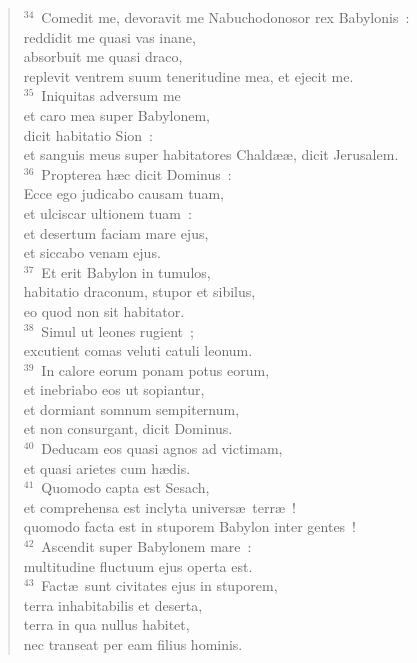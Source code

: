 \begin{flushleft}
\begin{verse}
${}^{34}$~Comedit me, devoravit me Nabuchodonosor rex Babylonis~:\\ reddidit me quasi vas inane,\\ absorbuit me quasi draco,\\ replevit ventrem suum teneritudine mea, et ejecit me.\\
${}^{35}$~Iniquitas adversum me\\ et caro mea super Babylonem,\\ dicit habitatio Sion~:\\ et sanguis meus super habitatores Chald\ae \ae , dicit Jerusalem.\\
${}^{36}$~Propterea h\ae c dicit Dominus~:\\ Ecce ego judicabo causam tuam,\\ et ulciscar ultionem tuam~:\\ et desertum faciam mare ejus,\\ et siccabo venam ejus.\\
${}^{37}$~Et erit Babylon in tumulos,\\ habitatio draconum, stupor et sibilus,\\ eo quod non sit habitator.\\
${}^{38}$~Simul ut leones rugient~;\\ excutient comas veluti catuli leonum.\\
${}^{39}$~In calore eorum ponam potus eorum,\\ et inebriabo eos ut sopiantur,\\ et dormiant somnum sempiternum,\\ et non consurgant, dicit Dominus.\\
${}^{40}$~Deducam eos quasi agnos ad victimam,\\ et quasi arietes cum h\ae dis.\\
${}^{41}$~Quomodo capta est Sesach,\\ et comprehensa est inclyta univers\ae\ terr\ae~!\\ quomodo facta est in stuporem Babylon inter gentes~!\\
${}^{42}$~Ascendit super Babylonem mare~:\\ multitudine fluctuum ejus operta est.\\
${}^{43}$~Fact\ae\ sunt civitates ejus in stuporem,\\ terra inhabitabilis et deserta,\\ terra in qua nullus habitet,\\ nec transeat per eam filius hominis.\\

\end{verse}
\end{flushleft}

